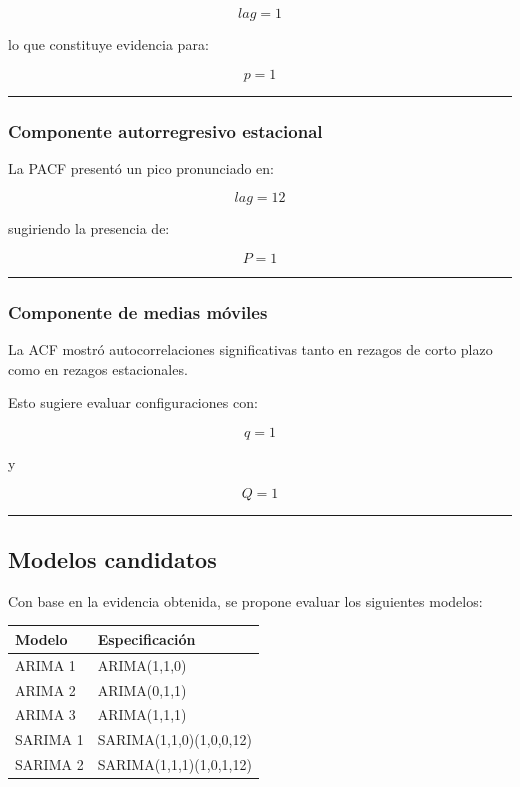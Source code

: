\documentclass[11pt]{article}
\begin{document}
\[
lag = 1
\]

lo que constituye evidencia para:

\[
p = 1
\]

\begin{center}\rule{0.5\linewidth}{0.5pt}\end{center}

\hypertarget{componente-autorregresivo-estacional}{%
\subsubsection{Componente autorregresivo
estacional}\label{componente-autorregresivo-estacional}}

La PACF presentó un pico pronunciado en:

\[
lag = 12
\]

sugiriendo la presencia de:

\[
P = 1
\]

\begin{center}\rule{0.5\linewidth}{0.5pt}\end{center}

\hypertarget{componente-de-medias-muxf3viles}{%
\subsubsection{Componente de medias
móviles}\label{componente-de-medias-muxf3viles}}

La ACF mostró autocorrelaciones significativas tanto en rezagos de corto
plazo como en rezagos estacionales.

Esto sugiere evaluar configuraciones con:

\[
q = 1
\]

y

\[
Q = 1
\]

\begin{center}\rule{0.5\linewidth}{0.5pt}\end{center}

\hypertarget{modelos-candidatos}{%
\subsection{Modelos candidatos}\label{modelos-candidatos}}

Con base en la evidencia obtenida, se propone evaluar los siguientes
modelos:

\begin{longtable}[]{@{}ll@{}}
\toprule\noalign{}
Modelo & Especificación \\
\midrule\noalign{}
\endhead
\bottomrule\noalign{}
\endlastfoot
ARIMA 1 & ARIMA(1,1,0) \\
ARIMA 2 & ARIMA(0,1,1) \\
ARIMA 3 & ARIMA(1,1,1) \\
SARIMA 1 & SARIMA(1,1,0)(1,0,0,12) \\
SARIMA 2 & SARIMA(1,1,1)(1,0,1,12) \\
\end{longtable}
\end{document}
